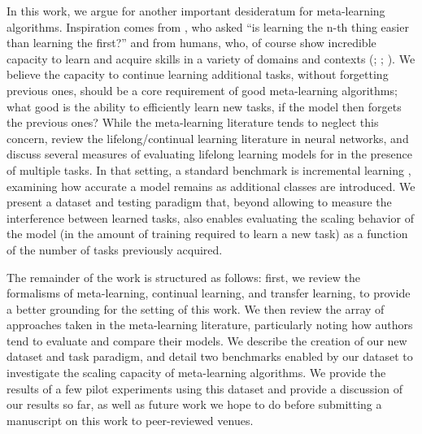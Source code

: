 In this work, we argue for another important desideratum for meta-learning algorithms. Inspiration comes from \textcite{Thrun1996}, who asked “is learning the n-th thing easier than learning the first?” and from humans, who, of course show incredible capacity to learn and acquire skills in a variety of domains and contexts (\cite{Brown1988}; \cite{Green2008}; \cite{Krakauer2011}). We believe the capacity to continue learning additional tasks, without forgetting previous ones, should be a core requirement of good meta-learning algorithms; what good is the ability to efficiently learn new tasks, if the model then forgets the previous ones? While the meta-learning literature tends to neglect this concern, \textcite{Parisi2019} review the lifelong/continual learning \parencite{Thrun1995} literature in neural networks, and discuss several measures of evaluating lifelong learning models for in the presence of multiple tasks. In that setting, a standard benchmark is incremental learning \parencite{Kemker2017a}, examining how accurate a model remains as additional classes are introduced. We present a dataset and testing paradigm that, beyond allowing to measure the interference between learned tasks, also enables evaluating the scaling behavior of the model (in the amount of training required to learn a new task) as a function of the number of tasks previously acquired.  

The remainder of the work is structured as follows: first, we review the formalisms of meta-learning, continual learning, and transfer learning, to provide a better grounding for the setting of this work. We then review the array of approaches taken in the meta-learning literature, particularly noting how authors tend to evaluate and compare their models. We describe the creation of our new dataset and task paradigm, and detail two benchmarks enabled by our dataset to investigate the scaling capacity of meta-learning algorithms. We provide the results of a few pilot experiments using this dataset and provide a discussion of our results so far, as well as future work we hope to do before submitting a manuscript on this work to peer-reviewed venues. 

